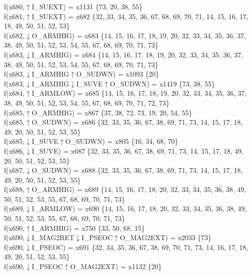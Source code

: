 f(x680,$\uparrow$I\_SUEXT) = x1131 \{73, 20, 38, 55\} \\  
f(x681,$\uparrow$I\_SUEXT) = x682 \{32, 33, 34, 35, 36, 67, 68, 69, 70, 71, 14, 15, 16, 17, 18, 49, 50, 51, 52, 53\} \\  
f(x682,$\downarrow$O\_ARMHIG) = x683 \{14, 15, 16, 17, 18, 19, 20, 32, 33, 34, 35, 36, 37, 38, 49, 50, 51, 52, 53, 54, 55, 67, 68, 69, 70, 71, 73\} \\  
f(x683,$\downarrow$I\_ARMHIG) = x684 \{14, 15, 16, 17, 18, 19, 20, 32, 33, 34, 35, 36, 37, 38, 49, 50, 51, 52, 53, 54, 55, 67, 68, 69, 70, 71, 73\} \\  
f(x683,$\downarrow$I\_ARMHIG$\uparrow$O\_SUDWN) = x1093 \{20\} \\  
f(x683,$\downarrow$I\_ARMHIG$\downarrow$I\_SUVE$\uparrow$O\_SUDWN) = x1419 \{73, 38, 55\} \\  
f(x684,$\uparrow$I\_ARMLOW) = x685 \{14, 15, 16, 17, 18, 19, 20, 32, 33, 34, 35, 36, 37, 38, 49, 50, 51, 52, 53, 54, 55, 67, 68, 69, 70, 71, 72, 73\} \\  
f(x685,$\uparrow$O\_ARMHIG) = x867 \{37, 38, 72, 73, 19, 20, 54, 55\} \\  
f(x685,$\uparrow$O\_SUDWN) = x686 \{32, 33, 35, 36, 67, 38, 69, 71, 73, 14, 15, 17, 18, 49, 20, 50, 51, 52, 53, 55\} \\  
f(x685,$\downarrow$I\_SUVE$\uparrow$O\_SUDWN) = x805 \{16, 34, 68, 70\} \\  
f(x686,$\downarrow$I\_SUVE) = x687 \{32, 33, 35, 36, 67, 38, 69, 71, 73, 14, 15, 17, 18, 49, 20, 50, 51, 52, 53, 55\} \\  
f(x687,$\downarrow$O\_SUDWN) = x688 \{32, 33, 35, 36, 67, 38, 69, 71, 73, 14, 15, 17, 18, 49, 20, 50, 51, 52, 53, 55\} \\  
f(x688,$\uparrow$O\_ARMHIG) = x689 \{14, 15, 16, 17, 18, 20, 32, 33, 34, 35, 36, 38, 49, 50, 51, 52, 53, 55, 67, 68, 69, 70, 71, 73\} \\  
f(x689,$\downarrow$I\_ARMLOW) = x690 \{14, 15, 16, 17, 18, 20, 32, 33, 34, 35, 36, 38, 49, 50, 51, 52, 53, 55, 67, 68, 69, 70, 71, 73\} \\  
f(x690,$\uparrow$I\_ARMHIG) = x750 \{33, 50, 68, 15\} \\  
f(x690,$\downarrow$I\_MAG2RET$\downarrow$I\_PSEOC$\uparrow$O\_MAG2EXT) = x2033 \{73\} \\  
f(x690,$\downarrow$I\_PSEOC) = x691 \{32, 34, 35, 36, 67, 38, 69, 70, 71, 73, 14, 16, 17, 18, 49, 20, 51, 52, 53, 55\} \\  
f(x690,$\downarrow$I\_PSEOC$\uparrow$O\_MAG2EXT) = x1132 \{20\} \\  
